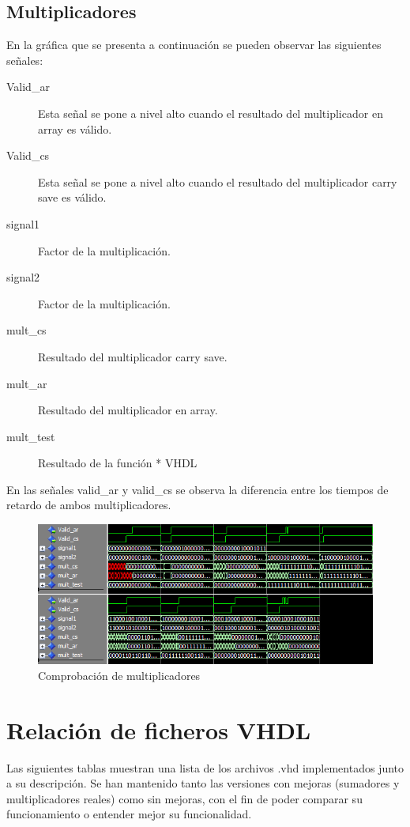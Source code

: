 \documentclass[a4paper,12pt]{article}
\begin{document}
\subsection{Multiplicadores}
En la gráfica que se presenta a continuación se pueden observar las siguientes señales:
\begin{description}
\item[Valid\_ar] Esta señal se pone a nivel alto cuando el resultado del multiplicador en array es válido.
\item[Valid\_cs] Esta señal se pone a nivel alto cuando el resultado del multiplicador carry save es válido.
\item[signal1] Factor de la multiplicación.
\item[signal2] Factor de la multiplicación.
\item[mult\_cs] Resultado del multiplicador carry save.
\item[mult\_ar] Resultado del multiplicador en array.
\item[mult\_test] Resultado de la función * VHDL
\end{description}
En las señales valid\_ar y valid\_cs se observa la diferencia entre los tiempos de retardo de ambos multiplicadores.
\begin{figure}[hbt]
\begin{center}
\includegraphics[width=\textwidth]{img/multiplier_test.png} 
\caption{Comprobación de multiplicadores} \label{fig:multipliertest}
\end{center}
\end{figure}
\clearpage

\section{Relación de ficheros VHDL}

Las siguientes tablas muestran una lista de los archivos .vhd implementados junto a su descripción. Se han mantenido tanto las versiones con mejoras (sumadores y multiplicadores reales) como sin mejoras, con el fin de poder comparar su funcionamiento o entender mejor su funcionalidad.
\end{document}
